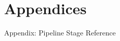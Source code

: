 \documentclass[
  ignorenonframetext,
]{beamer}
\author{\texorpdfstring{}{}}
\date{}
\begin{document}
\begin{frame}
\newpage
\end{frame}

\section{Appendices}\label{appendices}

\begin{frame}{Appendix: Pipeline Stage
Reference}
\protect{}\label{appendix-pipeline}
\begin{table}[h]
\caption{Single-project DAG exported from default \texttt{pipeline.yaml} (names shown in topological order). Scripts live under \texttt{scripts/}.}
\label{tab:pipeline-stages}
\end{table}


\end{frame}
\end{document}
